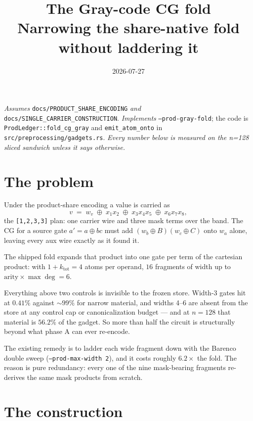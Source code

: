\documentclass[11pt]{article}
\title{\textbf{The Gray-code CG fold}\\[2pt]
\large Narrowing the share-native fold without laddering it}
\author{}
\date{2026-07-27}
\newcommand{\xor}{\oplus}
\newcommand{\code}[1]{\texttt{#1}}
\begin{document}
\maketitle

\noindent\emph{Assumes} \code{docs/PRODUCT\_SHARE\_ENCODING} \emph{and}
\code{docs/SINGLE\_CARRIER\_CONSTRUCTION}. \emph{Implements}
\code{--prod-gray-fold}; the code is \code{ProdLedger::fold\_cg\_gray} and
\code{emit\_atom\_onto} in \code{src/preprocessing/gadgets.rs}. \emph{Every number
below is measured on the n=128 sliced sandwich unless it says otherwise.}

\section{The problem}

Under the product-share encoding a value is carried as
\[
  v \;=\; w_v \;\xor\; x_1x_2 \;\xor\; x_3x_4x_5 \;\xor\; x_6x_7x_8 ,
\]
the \code{[1,2,3,3]} plan: one carrier wire and three mask terms over the band.
The CG for a source gate $a' = a \xor bc$ must add
$(w_b \xor B)(w_c \xor C)$ onto $w_a$ alone, leaving every aux wire exactly as
it found it.

The shipped fold expands that product into one gate per term of the cartesian
product: with $1 + k_{\mathrm{tot}} = 4$ atoms per operand, $16$ fragments of
width up to $\mathrm{arity} \times \max\deg = 6$.

Everything above two controls is invisible to the frozen store. Width-3 gates
hit at $0.41\%$ against $\sim\!99\%$ for narrow material, and widths 4--6 are
absent from the store at any control cap or canonicalization budget --- and at
$n=128$ that material is $56.2\%$ of the gadget. So more than half the circuit
is structurally beyond what phase A can ever re-encode.

The existing remedy is to ladder each wide fragment down with the Barenco
double sweep (\code{--prod-max-width 2}), and it costs roughly $6.2\times$ the
fold. The reason is pure redundancy: every one of the nine mask-bearing
fragments re-derives the same mask products from scratch.

\section{The construction}
\end{document}
